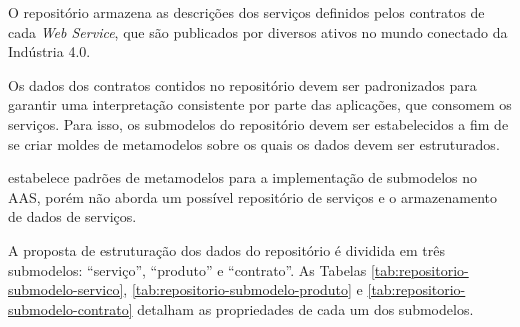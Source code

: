 O repositório armazena as descrições dos serviços definidos pelos contratos de cada \textit{Web Service}, que são publicados por diversos ativos no mundo conectado da Indústria 4.0.

Os dados dos contratos contidos no repositório devem ser padronizados para garantir uma interpretação consistente por parte das aplicações, que consomem os serviços. Para isso, os submodelos do repositório devem ser estabelecidos a fim de se criar moldes de metamodelos sobre os quais os dados devem ser estruturados.

 estabelece padrões de metamodelos para a implementação de submodelos no AAS, porém não aborda um possível repositório de serviços e o armazenamento de dados de serviços.

A proposta de estruturação dos dados do repositório é dividida em três submodelos: ``serviço'', ``produto'' e ``contrato''. As Tabelas \ref{tab:repositorio-submodelo-servico}, \ref{tab:repositorio-submodelo-produto} e \ref{tab:repositorio-submodelo-contrato} detalham as propriedades de cada um dos submodelos.

